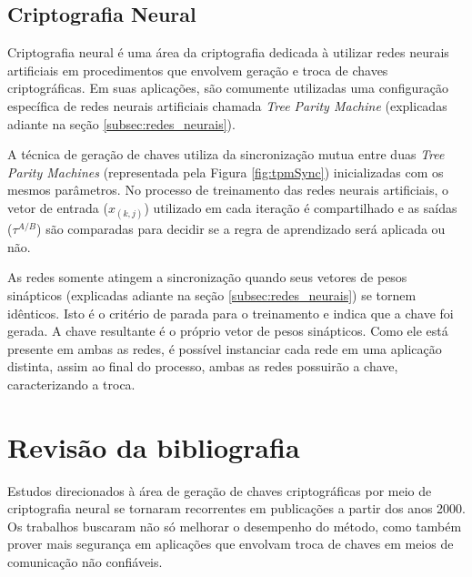 \documentclass[12pt]{article}
\begin{document}
        \subsection{Criptografia Neural}
        \label{subsec:criptografia_neural}
        
            Criptografia neural é uma área da criptografia dedicada à utilizar redes neurais artificiais em procedimentos que envolvem geração e troca de chaves criptográficas. Em suas aplicações, são comumente utilizadas uma configuração específica de redes neurais artificiais chamada \textit{Tree Parity Machine} (explicadas adiante na seção \ref{subsec:redes_neurais}).
            
            A técnica de geração de chaves utiliza da sincronização mutua entre duas \textit{Tree Parity Machines} (representada pela Figura \ref{fig:tpmSync}) inicializadas com os mesmos parâmetros. No processo de treinamento das redes neurais artificiais, o vetor de entrada ($x_{(k,j)}$) utilizado em cada iteração é compartilhado e as saídas ($\tau^{A/B}$) são comparadas para decidir se a regra de aprendizado será aplicada ou não.
            
            
            
            As redes somente atingem a sincronização quando seus vetores de pesos sinápticos (explicadas adiante na seção \ref{subsec:redes_neurais}) se tornem idênticos. Isto é o critério de parada para o treinamento e indica que a chave foi gerada. A chave resultante é o próprio vetor de pesos sinápticos. Como ele está presente em ambas as redes, é possível instanciar cada rede em uma aplicação distinta, assim ao final do processo, ambas as redes possuirão a chave, caracterizando a troca.
  
    \section{Revisão da bibliografia}
    \label{sec:revisao_da_bibliografia}
  
        Estudos direcionados à área de geração de chaves criptográficas por meio de criptografia neural se tornaram recorrentes em publicações a partir dos anos 2000. Os trabalhos buscaram não só melhorar o desempenho do método, como também prover mais segurança em aplicações que envolvam troca de chaves em meios de comunicação não confiáveis.
    
\end{document}
